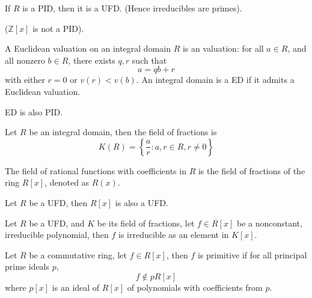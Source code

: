 \documentclass[openany]{book}
\newcommand{\Z}{\mathbb{Z}}
\begin{document}
\begin{prop}
    If $R$ is a PID, then it is a UFD. (Hence irreducibles are primes).

    ($\Z[x]$ is not a PID).
\end{prop}

\begin{defn}
    A Euclidean valuation on an integral domain $R$ is an valuation: for all $a\in R$, and all nonzero $b\in R$, there exists $q,r$ such that 
    \begin{equation*}
        a=qb+r
    \end{equation*}
    with either $r=0$ or $v(r)<v(b)$. An integral domain is a ED if it admits a Euclidean valuation.
\end{defn}

\begin{prop}
    ED is also PID.
\end{prop}


\begin{defn}
    Let $R$ be an integral domain, then the field of fractions is 
    \begin{equation*}
        K(R)=\left\{\frac{a}{r}: a,r\in R, r\neq 0\right\}
    \end{equation*}
\end{defn}

\begin{defn}
    The field of rational functions with coefficients in $R$ is the field of fractions of the ring $R[x]$, denoted as $R(x)$.
\end{defn}











\begin{thm}
    Let $R$ be a UFD, then $R[x]$ is also a UFD.
\end{thm}

\begin{prop}
    Let $R$ be a UFD, and $K$ be its field of fractions, let $f\in R[x]$ be a nonconstant, irreducible polynomial, then $f$ is irreducible as an element in $K[x]$.
\end{prop}



\begin{defn}
    Let $R$ be a commutative ring, let $f\in R[x]$, then $f$ is primitive if for all principal prime ideals $p$, 
    \begin{equation*}
        f\not\in pR[x]
    \end{equation*}
    where $p[x]$ is an ideal of $R[x]$ of polynomials with coefficients from $p$.
\end{defn}
\end{document}
